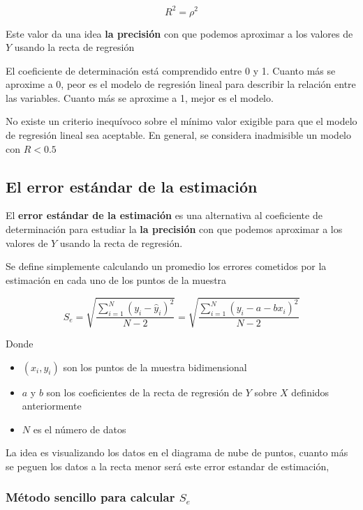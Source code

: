 \documentclass[]{book}
\providecommand{\tightlist}{%
  \setlength{\itemsep}{0pt}\setlength{\parskip}{0pt}}
\theoremstyle{plain}
\theoremstyle{definition}
\begin{document}
\[R^2 = \rho ^2\]

Este valor da una idea \textbf{la precisión} con que podemos aproximar a
los valores de \(Y\) usando la recta de regresión

El coeficiente de determinación está comprendido entre 0 y 1. Cuanto más
se aproxime a 0, peor es el modelo de regresión lineal para describir la
relación entre las variables. Cuanto más se aproxime a 1, mejor es el
modelo.

No existe un criterio inequívoco sobre el mínimo valor exigible para que
el modelo de regresión lineal sea aceptable. En general, se considera
inadmisible un modelo con \(R<0.5\)

\hypertarget{el-error-estuxe1ndar-de-la-estimaciuxf3n}{%
\subsection{El error estándar de la
estimación}\label{el-error-estuxe1ndar-de-la-estimaciuxf3n}}

El \textbf{error estándar de la estimación} es una alternativa al
coeficiente de determinación para estudiar la \textbf{la precisión} con
que podemos aproximar a los valores de \(Y\) usando la recta de
regresión.

Se define simplemente calculando un promedio los errores cometidos por
la estimación en cada uno de los puntos de la muestra

\[S_e = \sqrt{\frac{\sum^N_{i=1} (y_i - \hat y_i)^2 }{N-2}} = \sqrt{\frac{\sum^N_{i=1} (y_i - a - bx_i)^2 }{N-2}} \]

Donde

\begin{itemize}
\tightlist
\item
  \((x_i, y_i)\) son los puntos de la muestra bidimensional
\item
  \(a\) y \(b\) son los coeficientes de la recta de regresión de \(Y\)
  sobre \(X\) definidos anteriormente
\item
  \(N\) es el número de datos
\end{itemize}

La idea es visualizando los datos en el diagrama de nube de puntos,
cuanto más se peguen los datos a la recta menor será este error estandar
de estimación,

\hypertarget{muxe9todo-sencillo-para-calcular-s_e}{%
\subsubsection{\texorpdfstring{Método sencillo para calcular
\(S_e\)}{Método sencillo para calcular S\_e}}\label{muxe9todo-sencillo-para-calcular-s_e}}
\end{document}
